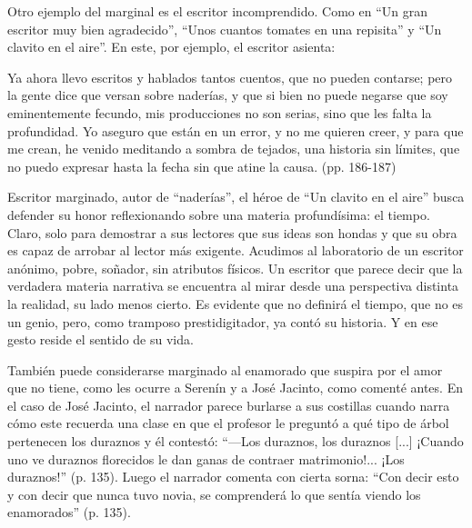 \documentclass[14pt,twoside,final]{extbook} %
\begin{document}
Otro ejemplo del marginal es el escritor incomprendido. Como en ``Un gran escritor muy bien agradecido'', ``Unos cuantos tomates en una repisita'' y ``Un clavito en el aire''. En este, por ejemplo, el escritor asienta:
\begin{quoting}
Ya ahora llevo escritos y hablados tantos cuentos, que no pueden contarse; pero la gente dice que versan sobre naderías, y que si bien no puede negarse que soy eminentemente fecundo, mis producciones no son serias, sino que les falta la profundidad. Yo aseguro que están en un error, y no me quieren creer, y para que me crean, he venido meditando a sombra de tejados, una historia sin límites, que no puedo expresar hasta la fecha sin que atine la causa. (pp. 186-187)
\end{quoting}
Escritor marginado, autor de ``naderías'', el héroe de ``Un clavito en el aire'' busca defender su honor reflexionando sobre una materia profundísima: el tiempo. Claro, solo para demostrar a sus lectores que sus ideas son hondas y que su obra es capaz de arrobar al lector más exigente. Acudimos al laboratorio de un escritor anónimo, pobre, soñador, sin atributos físicos. Un escritor que parece decir que la verdadera materia narrativa se encuentra al mirar desde una perspectiva distinta la realidad, su lado menos cierto. Es evidente que no definirá el tiempo, que no es un genio, pero, como tramposo prestidigitador, ya contó su historia. Y en ese gesto reside el sentido de su vida.

También puede considerarse marginado al enamorado que suspira por el amor que no tiene, como les ocurre a Serenín y a José Jacinto, como comenté antes. En el caso de José Jacinto, el narrador parece burlarse a sus costillas cuando narra cómo este recuerda una clase en que el profesor le preguntó a qué tipo de árbol pertenecen los duraznos y él contestó: ``---Los duraznos, los duraznos [...] ¡Cuando uno ve duraznos florecidos le dan ganas de contraer matrimonio!... ¡Los duraznos!'' (p. 135). Luego el narrador comenta con cierta sorna: ``Con decir esto y con decir que nunca tuvo novia, se comprenderá lo que sentía viendo los enamorados'' (p. 135).\protect\enlargethispage*{\baselineskip}
\end{document}
